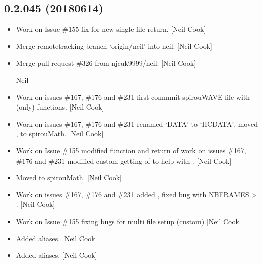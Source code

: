 \documentclass[a4paper,10pt,english]{report}
\begin{document}
\subsection{0.2.045 (2018\sphinxhyphen{}06\sphinxhyphen{}14)}
\label{\detokenize{misc/changelog:id440}}\begin{itemize}
\item {} 
Work on Issue \#155 \sphinxhyphen{} fix for new single file return. {[}Neil Cook{]}

\item {} 
Merge remote\sphinxhyphen{}tracking branch ‘origin/neil’ into neil. {[}Neil Cook{]}

\item {} 
Merge pull request \#326 from njcuk9999/neil. {[}Neil Cook{]}

Neil

\item {} 
Work on issues \#167, \#176 and \#231 \sphinxhyphen{} first commmit spirouWAVE file
with  (only) functions. {[}Neil Cook{]}

\item {} 
Work on issues \#167, \#176 and \#231 \sphinxhyphen{} renamed ‘DATA’ to ‘HCDATA’, moved
,  to spirouMath. {[}Neil Cook{]}

\item {} 
Work on Issue \#155 \sphinxhyphen{} modified  function and return of
 work on issues \#167, \#176 and \#231 \sphinxhyphen{} modified custom
getting of  to help with . {[}Neil Cook{]}

\item {} 
Moved  to spirouMath. {[}Neil Cook{]}

\item {} 
Work on issues \#167, \#176 and \#231 \sphinxhyphen{} added , fixed bug with
NBFRAMES  \textendash{}\textgreater{} . {[}Neil Cook{]}

\item {} 
Work on Issue \#155 \sphinxhyphen{} fixing bugs for multi file setup (custom) {[}Neil
Cook{]}

\item {} 
Added aliases. {[}Neil Cook{]}

\item {} 
Added aliases. {[}Neil Cook{]}


\end{itemize}
\end{document}
